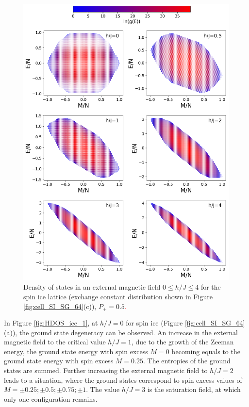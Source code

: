 \documentclass[preprint,12pt]{elsarticle}
\begin{document}
	
	\begin{figure}[H]
		\centering
		\includegraphics[width=1\linewidth]{pictures/HDOS_SI_64_J0.png}
		\caption{Density of states in an external magnetic field $0\leq h/J \leq 4$ for the spin ice lattice (exchange constant distribution shown in Figure \ref{fig:cell_SI_SG_64}(c)), $P_+ = 0.5$\textcolor{red}{.}}
		\label{fig:HDOS_ice}
	\end{figure}
	
	In Figure \ref{fig:HDOS_ice_1}, at $h/J=0$ for spin ice (Figure \ref{fig:cell_SI_SG_64}(a)), the ground state degeneracy can be observed. An increase in the external magnetic field to the critical value $h/J=1$, due to the growth of the Zeeman energy, the ground state energy with spin excess $M=0$ becoming equals to the ground state energy with spin excess $M=0.25$. The entropies of the ground states are summed. Further increasing the external magnetic field to $h/J=2$ leads to a situation, where the ground states correspond to spin excess values of $M=\pm0.25; \pm0.5; \pm0.75; \pm1$.
	The value  $h/J=3$ is the saturation field, at which only one configuration remains.
	
\end{document}

